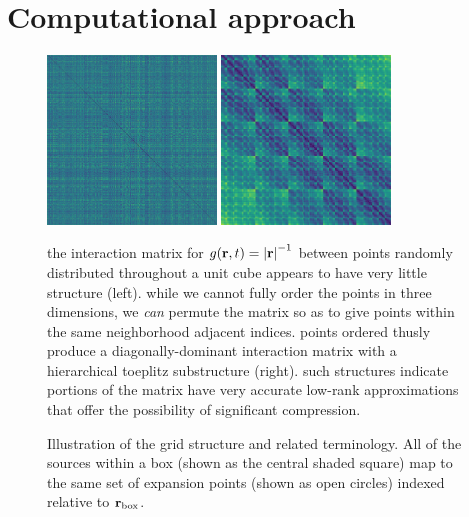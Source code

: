 \section{Computational approach}

\begin{figure}
  \centering
  \ifmakeplots
    \includegraphics[width=0.4\textwidth]{figures/dist_mat_unsorted}
    \hspace{1cm}
    \includegraphics[width=0.4\textwidth]{figures/dist_mat_sorted}
  \fi
  \caption{\label{fig:matrix structure} the interaction matrix for $g(\vb{r}, t) = \abs{\vb{r}}^{-1}$ between points randomly distributed throughout a unit cube appears to have very little structure (left).
    while we cannot fully order the points in three dimensions, we \emph{can} permute the matrix so as to give points within the same neighborhood adjacent indices.
    points ordered thusly produce a diagonally-dominant interaction matrix with a hierarchical toeplitz substructure (right).
    such structures indicate portions of the matrix have very accurate low-rank approximations that offer the possibility of significant compression.
  }
\end{figure}

\begin{figure}
  \centering
  \caption{\label{fig:aim terminology} Illustration of the grid structure and related terminology.
    All of the sources within a box (shown as the central shaded square) map to the same set of expansion points (shown as open circles) indexed relative to $\vb{r}_\text{box}$.
  }
\end{figure}

